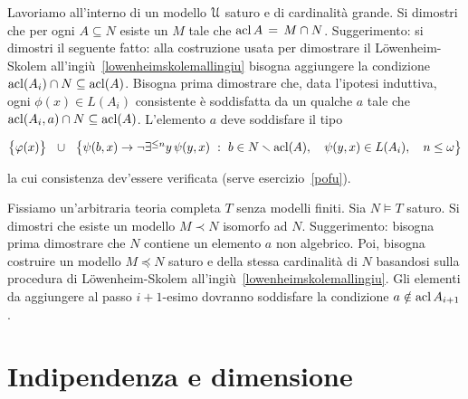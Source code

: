\begin{exercise}
Lavoriamo all'interno di un modello $\EuScript U$ saturo e di cardinalit\`a grande. Si dimostri che per ogni $A\subseteq N$ esiste un $M$ tale che $\mathop{\rm acl} A\,=\,M\cap N$. Suggerimento: si dimostri il seguente fatto: alla costruzione usata per dimostrare il L\"owenheim-Skolem all'ingi\`u~\ref{lowenheimskolemallingiu} bisogna aggiungere la condizione  $\mathop{\rm acl}(A_i)\cap N\subseteq\mathop{\rm acl}(A)$. Bisogna prima dimostrare che, data l'ipotesi induttiva, ogni $\phi(x)\in L(A_i)$ consistente \`e soddisfatta da un qualche $a$ tale che $\mathop{\rm acl}(A_i,a)\cap N\subseteq\mathop{\rm acl}(A)$. L'elemento $a$ deve soddisfare il tipo

\hfil$\big\{\phi(x)\big\}\ \ \cup\ \ \big\{\psi(b,x)\imp\neg\E^{\le n}y\,\psi(y,x)\ :\ b\in N\sm\acl(A),\ \ \ \psi(y,x)\in L(A_i),\ \ \ n\le\omega\big\}$

la cui consistenza dev'essere verificata (serve esercizio~\ref{pofu}).\QED
\end{exercise}

\begin{exercise}
Fissiamo un'arbitraria teoria completa $T$ senza modelli finiti. Sia $N\models T$ saturo. Si dimostri che esiste un modello $M\prec N$ isomorfo ad $N$. Suggerimento: bisogna prima dimostrare che $N$ contiene un elemento $a$ non algebrico. Poi, %
bisogna costruire un modello $M\preceq N$ saturo e della stessa cardinalit\`a di $N$ basandosi sulla procedura di L\"owenheim-Skolem all'ingi\`u~\ref{lowenheimskolemallingiu}. Gli elementi da aggiungere al passo $i+1$-esimo dovranno soddisfare la condizione $a\notin\mathop{\rm acl} A_{i+1}$.\QED
\end{exercise}




\section{Indipendenza e dimensione}


